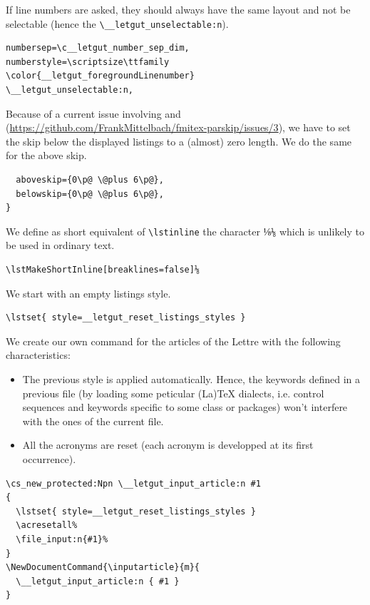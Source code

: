 \documentclass{letgut}
\begin{document}
If line numbers are asked, they should always have the same layout and not be
selectable (hence the \lstinline+\__letgut_unselectable:n+).

\begin{lstlisting}
numbersep=\c__letgut_number_sep_dim,
numberstyle=\scriptsize\ttfamily
\color{__letgut_foregroundLinenumber}
\__letgut_unselectable:n,
\end{lstlisting}

Because of a current issue involving  and 
(\url{https://github.com/FrankMittelbach/fmitex-parskip/issues/3}), we have to
set the skip below the displayed listings to a (almost) zero length. We do the
same for the above skip.

\begin{lstlisting}
  aboveskip={0\p@ \@plus 6\p@},
  belowskip={0\p@ \@plus 6\p@},
}
\end{lstlisting}

We define as short equivalent of \lstinline+\lstinline+ the character
\lstDeleteShortInline⅛\texttt{⅛} which is unlikely to be used in ordinary text.

\begin{lstlisting}
\lstMakeShortInline[breaklines=false]⅛
\end{lstlisting}

We start with an empty listings style.

\begin{lstlisting}
\lstset{ style=__letgut_reset_listings_styles }
\end{lstlisting}

We create our own \lstinline++ command for the articles of the Lettre with the
following characteristics:

\begin{itemize}
\item The previous style is applied automatically. Hence, the keywords defined in
a previous file (by loading some peticular (La)\TeX{} dialects, i.e. control
sequences and keywords specific to some class or packages) won't interfere
with the ones of the current file.
\item All the acronyms are reset (each acronym is developped at its first occurrence).
\end{itemize}

\begin{lstlisting}
\cs_new_protected:Npn \__letgut_input_article:n #1
{
  \lstset{ style=__letgut_reset_listings_styles }
  \acresetall%
  \file_input:n{#1}%
}
\NewDocumentCommand{\inputarticle}{m}{
  \__letgut_input_article:n { #1 }
}
\end{lstlisting}
\end{document}
